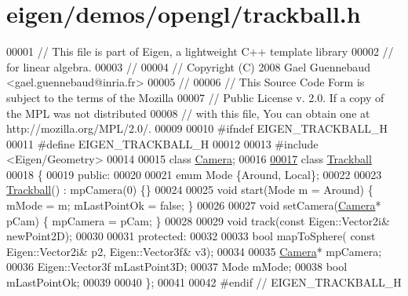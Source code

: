 \hypertarget{eigen_2demos_2opengl_2trackball_8h_source}{}\section{eigen/demos/opengl/trackball.h}
\label{eigen_2demos_2opengl_2trackball_8h_source}

\begin{DoxyCode}
00001 \textcolor{comment}{// This file is part of Eigen, a lightweight C++ template library}
00002 \textcolor{comment}{// for linear algebra.}
00003 \textcolor{comment}{//}
00004 \textcolor{comment}{// Copyright (C) 2008 Gael Guennebaud <gael.guennebaud@inria.fr>}
00005 \textcolor{comment}{//}
00006 \textcolor{comment}{// This Source Code Form is subject to the terms of the Mozilla}
00007 \textcolor{comment}{// Public License v. 2.0. If a copy of the MPL was not distributed}
00008 \textcolor{comment}{// with this file, You can obtain one at http://mozilla.org/MPL/2.0/.}
00009 
00010 \textcolor{preprocessor}{#ifndef EIGEN\_TRACKBALL\_H}
00011 \textcolor{preprocessor}{#define EIGEN\_TRACKBALL\_H}
00012 
00013 \textcolor{preprocessor}{#include <Eigen/Geometry>}
00014 
00015 \textcolor{keyword}{class }\hyperlink{class_camera}{Camera};
00016 
\hyperlink{class_trackball}{00017} \textcolor{keyword}{class }\hyperlink{class_trackball}{Trackball}
00018 \{
00019   \textcolor{keyword}{public}:
00020 
00021     \textcolor{keyword}{enum} Mode \{Around, Local\};
00022 
00023     \hyperlink{class_trackball}{Trackball}() : mpCamera(0) \{\}
00024 
00025     \textcolor{keywordtype}{void} start(Mode m = Around) \{ mMode = m; mLastPointOk = \textcolor{keyword}{false}; \}
00026 
00027     \textcolor{keywordtype}{void} setCamera(\hyperlink{class_camera}{Camera}* pCam) \{ mpCamera = pCam; \}
00028 
00029     \textcolor{keywordtype}{void} track(\textcolor{keyword}{const} Eigen::Vector2i& newPoint2D);
00030 
00031   \textcolor{keyword}{protected}:
00032 
00033     \textcolor{keywordtype}{bool} mapToSphere( \textcolor{keyword}{const} Eigen::Vector2i& p2, Eigen::Vector3f& v3);
00034 
00035     \hyperlink{class_camera}{Camera}* mpCamera;
00036     Eigen::Vector3f mLastPoint3D;
00037     Mode mMode;
00038     \textcolor{keywordtype}{bool} mLastPointOk;
00039 
00040 \};
00041 
00042 \textcolor{preprocessor}{#endif // EIGEN\_TRACKBALL\_H}
\end{DoxyCode}
